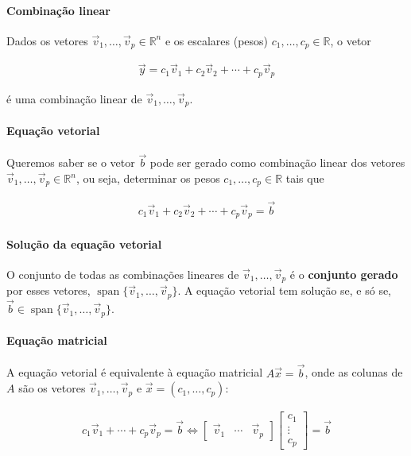 \documentclass{article}
\begin{document}
\paragraph{Combinação linear}

Dados os vetores $\vec{v}_1, \ldots, \vec{v}_p \in \mathbb{R}^n$ e os escalares (pesos)
$c_1, \ldots, c_p \in \mathbb{R}$, o vetor

\begin{gather*}
\vec{y} = c_1 \vec{v}_1 + c_2 \vec{v}_2 + \cdots + c_p \vec{v}_p
\end{gather*}

é uma combinação linear de $\vec{v}_1, \ldots, \vec{v}_p$.

\paragraph{Equação vetorial}

Queremos saber se o vetor $\vec{b}$ pode ser gerado como combinação linear dos vetores
$\vec{v}_1, \ldots, \vec{v}_p \in \mathbb{R}^n$, ou seja, determinar os pesos $c_1, \ldots, c_p \in \mathbb{R}$
tais que

\begin{gather*}
c_1 \vec{v}_1 + c_2 \vec{v}_2 + \cdots + c_p \vec{v}_p = \vec{b}
\end{gather*}

\paragraph{Solução da equação vetorial}

O conjunto de todas as combinações lineares de $\vec{v}_1, \ldots, \vec{v}_p$ é o \textbf{conjunto gerado}
por esses vetores, $\operatorname{span}\{\vec{v}_1, \ldots, \vec{v}_p\}$. A equação vetorial tem solução
se, e só se, $\vec{b} \in \operatorname{span}\{\vec{v}_1, \ldots, \vec{v}_p\}$.

\paragraph{Equação matricial}

A equação vetorial é equivalente à equação matricial $A\vec{x} = \vec{b}$, onde as colunas de $A$ são os
vetores $\vec{v}_1, \ldots, \vec{v}_p$ e $\vec{x} = (c_1, \ldots, c_p)$:

\begin{gather*}
c_1 \vec{v}_1 + \cdots + c_p \vec{v}_p = \vec{b}
\Leftrightarrow
\begin{bmatrix}
\vec{v}_1 & \cdots & \vec{v}_p
\end{bmatrix}
\begin{bmatrix}
c_1 \\
\vdots \\
c_p
\end{bmatrix}
= \vec{b}
\end{gather*}
\end{document}
